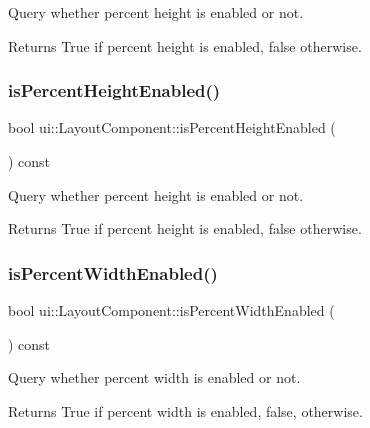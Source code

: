 Query whether percent height is enabled or not. \begin{DoxyReturn}{Returns}
True if percent height is enabled, false otherwise. 
\end{DoxyReturn}
\mbox{\label{classui_1_1LayoutComponent_a79fe2006defc4f1f69104b415e800825}} 
\subsubsection{\texorpdfstring{is\+Percent\+Height\+Enabled()}{isPercentHeightEnabled()}\hspace{0.1cm}{\footnotesize\ttfamily [2/2]}}
{\footnotesize\ttfamily bool ui\+::\+Layout\+Component\+::is\+Percent\+Height\+Enabled (\begin{DoxyParamCaption}{ }\end{DoxyParamCaption}) const}

Query whether percent height is enabled or not. \begin{DoxyReturn}{Returns}
True if percent height is enabled, false otherwise. 
\end{DoxyReturn}
\mbox{\label{classui_1_1LayoutComponent_a7572a7ba515d90463eaa237ac9547275}} 
\subsubsection{\texorpdfstring{is\+Percent\+Width\+Enabled()}{isPercentWidthEnabled()}\hspace{0.1cm}{\footnotesize\ttfamily [1/2]}}
{\footnotesize\ttfamily bool ui\+::\+Layout\+Component\+::is\+Percent\+Width\+Enabled (\begin{DoxyParamCaption}{ }\end{DoxyParamCaption}) const}

Query whether percent width is enabled or not. \begin{DoxyReturn}{Returns}
True if percent width is enabled, false, otherwise. 
\end{DoxyReturn}
\mbox{\label{classui_1_1LayoutComponent_a7572a7ba515d90463eaa237ac9547275}} 

